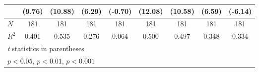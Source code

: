 \begin{table}[htbp]
\begin{tabular}{l*{8}{c}}
          &   (9.76)         &  (10.88)         &   (6.29)         &  (-0.70)         &  (12.08)         &  (10.58)         &   (6.59)         &  (-6.14)         \\
\hline
\(N\)     &      181         &      181         &      181         &      181         &      181         &      181         &      181         &      181         \\
\(R^{2}\) &    0.401         &    0.535         &    0.276         &    0.064         &    0.500         &    0.497         &    0.348         &    0.334         \\
\hline\hline
\multicolumn{9}{l}{\footnotesize \textit{t} statistics in parentheses}\\
\multicolumn{9}{l}{\footnotesize \sym{*} \(p<0.05\), \sym{**} \(p<0.01\), \sym{***} \(p<0.001\)}\\
\end{tabular}
\end{table}
